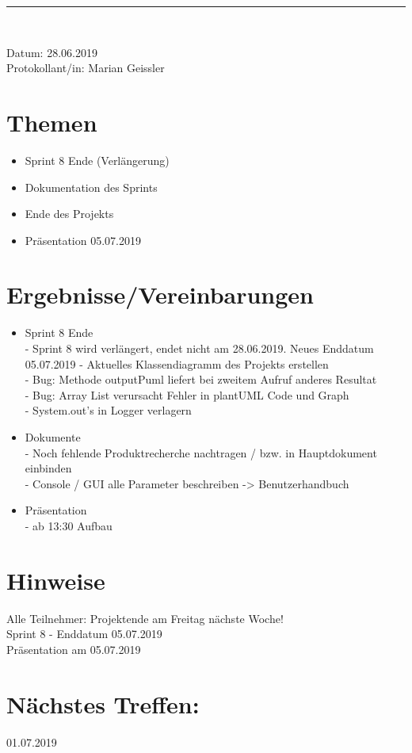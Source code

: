 \begin{center}  
\vspace{0.5pt}\nointerlineskip\rule{\textwidth}{0.2pt}\\ 
\vspace{0.5pt}\nointerlineskip
\end{center} 
\large Datum: 28.06.2019\vspace{3pt}\\\large Protokollant/in: Marian Geissler
\section*{Themen}
\begin{itemize}
\item Sprint 8 Ende (Verlängerung)\\
\item Dokumentation des Sprints\\
\item Ende des Projekts \\
\item Präsentation 05.07.2019\\
\end{itemize}
\section*{Ergebnisse/Vereinbarungen}
\begin{itemize}
\item Sprint 8 Ende\\
- Sprint 8 wird verlängert, endet nicht am 28.06.2019. Neues Enddatum 05.07.2019
- Aktuelles Klassendiagramm des Projekts erstellen\\
- Bug: Methode outputPuml liefert bei zweitem Aufruf anderes Resultat\\
- Bug: Array List verursacht Fehler in plantUML Code und Graph\\
- System.out's in Logger verlagern\\
\item Dokumente \\
- Noch fehlende Produktrecherche nachtragen / bzw. in Hauptdokument einbinden\\
- Console / GUI alle Parameter beschreiben -> Benutzerhandbuch\\
\item Präsentation \\
- ab 13:30 Aufbau \\

\end{itemize}
\section*{Hinweise}
Alle Teilnehmer: Projektende am Freitag nächste Woche!\\
Sprint 8 - Enddatum 05.07.2019\\
Präsentation am 05.07.2019
\section*{Nächstes Treffen:}
01.07.2019
